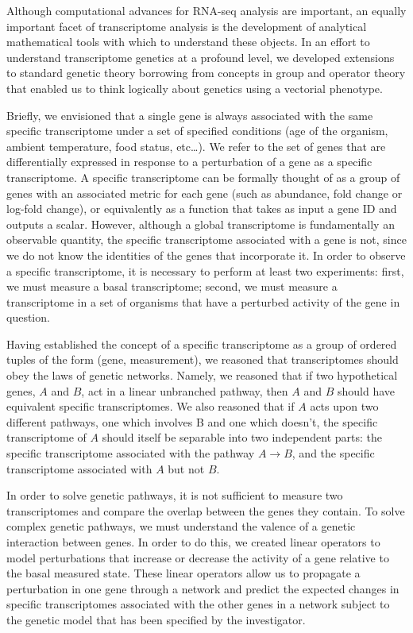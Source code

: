 \documentclass[9pt,twocolumn,twoside]{pnas-new}
\begin{document}
Although computational advances for RNA-seq analysis are important, an equally important facet of transcriptome analysis is the development of analytical mathematical tools with which to understand these objects. In an effort to understand transcriptome genetics at a profound level, we developed extensions to standard genetic theory borrowing from concepts in group and operator theory that enabled us to think logically about genetics using a vectorial phenotype.

Briefly, we envisioned that a single gene is always associated with the same specific transcriptome under a set of specified conditions (age of the organism, ambient temperature, food status, etc\dots). We refer to the set of genes that are differentially expressed in response to a perturbation of a gene as a specific transcriptome. A specific transcriptome can be formally thought of as a group of genes with an associated metric for each gene (such as abundance, fold change or log-fold change), or equivalently as a function that takes as input a gene ID and outputs a scalar.
However, although a global transcriptome is fundamentally an observable quantity, the specific transcriptome associated with a gene is not, since we do not know the identities of the genes that incorporate it. In order to observe a specific transcriptome, it is necessary to perform at least two experiments: first, we must measure a basal transcriptome; second, we must measure a transcriptome in a set of organisms that have a perturbed activity of the gene in question.

Having established the concept of a specific transcriptome as a group of ordered tuples of the form (gene, measurement), we reasoned that transcriptomes should obey the laws of genetic networks. Namely, we reasoned that if two hypothetical genes, $A$ and $B$, act in a linear unbranched pathway, then $A$ and $B$ should have equivalent specific transcriptomes. We also reasoned that if $A$ acts upon two different pathways, one which involves B and one which doesn't, the specific transcriptome of $A$ should itself be separable into two independent parts: the specific transcriptome associated with the pathway $A\rightarrow B$, and the specific transcriptome associated with $A$ but not $B$.

In order to solve genetic pathways, it is not sufficient to measure two transcriptomes and compare the overlap between the genes they contain. To solve complex genetic pathways, we must understand the valence of a genetic interaction between genes. In order to do this, we created linear operators to model perturbations that increase or decrease the activity of a gene relative to the basal measured state. These linear operators allow us to propagate a perturbation in one gene through a network and predict the expected changes in specific transcriptomes associated with the other genes in a network subject to the genetic model that has been specified by the investigator.
\end{document}
